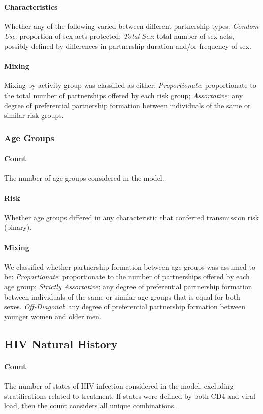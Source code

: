 \paragraph{Characteristics}
Whether any of the following varied between different partnership types:
\emph{Condom Use}: proportion of sex acts protected;
\emph{Total Sex}: total number of sex acts, possibly defined by differences in
partnership duration and/or frequency of sex.
\paragraph{Mixing}
Mixing by activity group was classified as either:
\emph{Proportionate}: proportionate to the total number of partnerships offered by each risk group;
\emph{Assortative}: any degree of preferential partnership formation between
individuals of the same or similar risk groups.
\subsubsection{Age Groups}
\label{aaa:defs:age}
\paragraph{Count}
The number of age groups considered in the model.
\paragraph{Risk}
Whether age groups differed in any characteristic that conferred transmission risk (binary).
\paragraph{Mixing}
We classified whether partnership formation between age groups was assumed to be:
\emph{Proportionate}: proportionate to the number of partnerships offered by each age group;
\emph{Strictly Assortative}: any degree of preferential partnership formation between
individuals of the same or similar age groups that is equal for both sexes.
\emph{Off-Diagonal}: any degree of preferential partnership formation between younger women and older men.
\subsection{HIV Natural History}
\label{aa:defs:hiv}
\paragraph{Count}
The number of states of HIV infection considered in the model,
excluding stratifications related to treatment.
If states were defined by both CD4 and viral load,
then the count considers all unique combinations.
